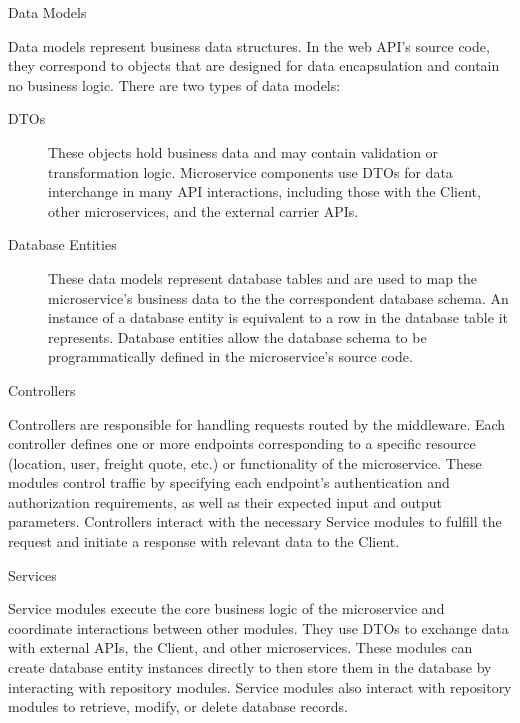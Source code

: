 \documentclass[12pt, reqno]{amsbook}
\makeatletter
\def\subsection{\@startsection{subsection}{2}%
      \z@{.5\linespacing\@plus.7\linespacing}{.25\linespacing}%
      {\normalfont\bfseries\flushleft}}
\theoremstyle{definition}
\theoremstyle{definition}
\numberwithin{section}{chapter}
\numberwithin{table}{chapter}
\numberwithin{figure}{chapter}
\makeatother
\begin{document}
\subsection{Data Models}

Data models represent business data structures. In the web \ac{API}'s source code, they correspond to objects that are designed for data encapsulation and contain no business logic. There are two types of data models:

\begin{description}
  \item[\acp{DTO}] These objects hold business data and may contain validation or transformation logic. Microservice components use \acp{DTO} for data interchange in many \ac{API} interactions, including those with the Client, other microservices, and the external carrier \acp{API}.
  \item[Database Entities] These data models represent database tables and are used to map the microservice's business data to the the correspondent database schema. An instance of a database entity is equivalent to a row in the database table it represents. Database entities allow the database schema to be programmatically defined in the microservice's source code.
\end{description}

\subsection{Controllers}

Controllers are responsible for handling requests routed by the middleware. Each controller defines one or more endpoints corresponding to a specific resource (location, user, freight quote, etc.) or functionality of the microservice. These modules control traffic by specifying each endpoint's authentication and authorization requirements, as well as their expected input and output parameters. Controllers interact with the necessary Service modules to fulfill the request and initiate a response with relevant data to the Client.

\subsection{Services}

Service modules execute the core business logic of the microservice and coordinate interactions between other modules. They use \acp{DTO} to exchange data with external \acp{API}, the Client, and other microservices. These modules can create database entity instances directly to then store them in the database by interacting with repository modules. Service modules also interact with repository modules to retrieve, modify, or delete database records.
\end{document}
